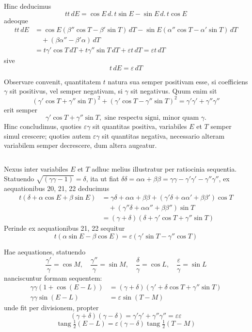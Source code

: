 \documentclass[12pt,a4paper]{article}
\DeclareMathOperator{\tang}{tang}
\begin{document}
Hinc deducimus
\[
tt\,dE = \cos E\,d.\,t\sin E - \sin E\,d.\,t\cos E
\]
adeoque
\[
\begin{aligned}
tt\,dE &= \cos E(\beta''\cos T - \beta'\sin T)\,dT - \sin E(\alpha''\cos T - \alpha'\sin T)\,dT \\
&\quad + (\beta\alpha'' - \beta'\alpha)\,dT \\
&= t\gamma'\cos T\,dT + t\gamma''\sin T\,dT + \varepsilon t\,dT = \varepsilon t\,dT
\end{aligned}
\]
sive
\[
t\,dE = \varepsilon\,dT
\tag{23}
\]

Observare convenit, quantitatem $t$ natura sua semper positivam esse, si coefficiens $\gamma$ sit positivus, vel semper negativam, si $\gamma$ sit negativus. Quum enim sit
\[
(\gamma'\cos T + \gamma''\sin T)^2 + (\gamma'\cos T - \gamma''\sin T)^2 = \gamma'\gamma' + \gamma''\gamma''
\]
erit semper
\[
\gamma'\cos T + \gamma''\sin T, \text{ sine respectu signi, minor quam } \gamma.
\]
Hinc concludimus, quoties $\varepsilon\gamma$ sit quantitas positiva, variabiles $E$ et $T$ semper simul crescere; quoties autem $\varepsilon\gamma$ sit quantitas negativa, necessario alteram variabilem semper decrescere, dum altera augeatur.

\setcounter{subsection}{12}
\subsection{}

Nexus inter variabiles $E$ et $T$ adhuc melius illustratur per ratiocinia sequentia. Statuendo $\sqrt{(\gamma\gamma-1)} = \delta$, ita ut fiat $\delta\delta = \alpha\alpha + \beta\beta = \gamma\gamma - \gamma'\gamma' - \gamma''\gamma''$, ex aequationibus 20, 21, 22 deducimus
\[
\begin{aligned}
t(\delta + \alpha\cos E + \beta\sin E) &= \gamma\delta + \alpha\alpha + \beta\beta + (\gamma'\delta + \alpha\alpha' + \beta\beta')\cos T \\
&\quad + (\gamma''\delta + \alpha\alpha'' + \beta\beta'')\sin T \\
&= (\gamma + \delta)(\delta + \gamma'\cos T + \gamma''\sin T)
\end{aligned}
\]
Perinde ex aequationibus 21, 22 sequitur
\[
t(\alpha\sin E - \beta\cos E) = \varepsilon(\gamma'\sin T - \gamma''\cos T)
\]

Hae aequationes, statuendo
\[
\frac{\gamma'}{\gamma} = \cos M, \quad \frac{\gamma''}{\gamma} = \sin M, \quad
\frac{\delta}{\gamma} = \cos L, \quad \frac{\varepsilon}{\gamma} = \sin L
\]
nanciscuntur formam sequentem:
\[
\begin{aligned}
\gamma\gamma(1 + \cos(E-L)) &= (\gamma + \delta)(\gamma' + \delta\cos T + \gamma''\sin T) \\
\gamma\gamma\sin(E-L) &= \varepsilon\sin(T-M)
\end{aligned}
\]
unde fit per divisionem, propter
\[
(\gamma + \delta)(\gamma - \delta) = \gamma'\gamma' + \gamma''\gamma'' = \varepsilon\varepsilon
\]
\[
\tang\tfrac{1}{2}(E-L) = \varepsilon(\gamma-\delta)\tang\tfrac{1}{2}(T-M)
\]
\end{document}
